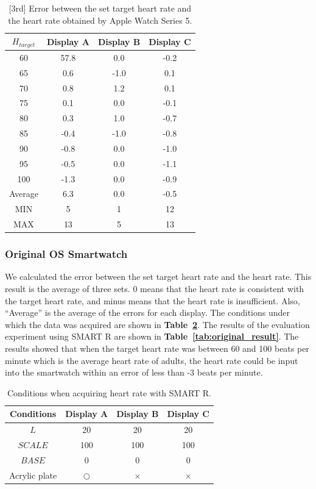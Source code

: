 \documentclass[sigchi,authordraft]{acmart}
\newcommand\tabref[1]{\textbf{Table~\ref{tab:#1}}}
\begin{document}
\begin{table}[!t]
  \centering
  \caption{[3rd] Error between the set target heart rate and the heart rate obtained by Apple Watch Series 5.}
  \begin{tabular}{c|c|c|c} \hline\hline
    $H_{target}$ & Display A & Display B & Display C \\ \hline
    60 & 57.8 & 0.0 & -0.2 \\
    65 & 0.6 & -1.0 & 0.1 \\
    70 & 0.8 & 1.2 & 0.1 \\
    75 & 0.1 & 0.0 & -0.1 \\
    80 & 0.3 & 1.0 & -0.7 \\
    85 & -0.4 & -1.0 & -0.8 \\
    90 & -0.8 & 0.0 & -1.0 \\
    95 & -0.5 & 0.0 & -1.1 \\
    100 & -1.3 & 0.0 & -0.9 \\ \hline
    Average & 6.3 & 0.0 & -0.5 \\ \hline \hline
    MIN & 5 & 1 & 12 \\ \hline
    MAX & 13 & 5 & 13 \\ \hline
  \end{tabular}
  \label{tab:series5_result_3rd}
\end{table}


\subsubsection{Original OS Smartwatch}
We calculated the error between the set target heart rate and the heart rate. This result is the average of three sets. 0 means that the heart rate is consistent with the target heart rate, and minus means that the heart rate is insufficient. Also, ``Average'' is the average of the errors for each display. The conditions under which the data was acquired are shown in \tabref{original_params}. The results of the evaluation experiment using SMART R are shown in \tabref{original_result}. The results showed that when the target heart rate was between 60 and 100 beats per minute which is the average heart rate of adults, the heart rate could be input into the smartwatch within an error of less than -3 beats per minute.

\begin{table}[!t]
  \centering
  \caption{Conditions when acquiring heart rate with SMART R.}
  \begin{tabular}{c|c|c|c} \hline\hline
    Conditions & Display A & Display B & Display C \\ \hline
    $L$ & 20 & 20 & 20 \\
    $SCALE$ & 100 & 100 & 100 \\
    $BASE$ & 0 & 0 & 0 \\
    Acrylic plate & $\bigcirc$ & $\times$ & $\times$ \\ \hline
  \end{tabular}
  \label{tab:original_params}
\end{table}
\end{document}
